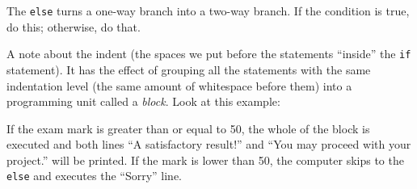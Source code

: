 
The  \verb!else! turns a one-way branch into a two-way branch.  If the
condition is true, do this; otherwise, do that.






A note about the indent (the spaces we put before the statements
``inside'' the \texttt{if} statement). It has the effect of
grouping all the statements with the same indentation level (the same
amount of whitespace before them) into a programming unit called a
\emph{block}.
Look at this example: 
\pagebreak


If the exam mark is greater than or equal to 50, 
the whole of the block is executed and both
lines ``A satisfactory result!'' and ``You may proceed with your
project.'' will be printed.  If the mark is lower than 50, 
the computer skips to
the \verb!else! and executes the ``Sorry'' line.

